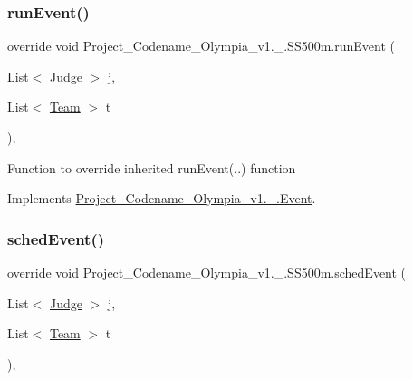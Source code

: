 \mbox{\label{classProject__Codename__Olympia__v1_1_1__0_1_1SS500m_a28582161ab61bb80635656e48ebfc664}} 
\subsubsection{\texorpdfstring{run\+Event()}{runEvent()}}
{\footnotesize\ttfamily override void Project\+\_\+\+Codename\+\_\+\+Olympia\+\_\+v1.\+\_.\+S\+S500m.\+run\+Event (\begin{DoxyParamCaption}\item[{List$<$ \hyperlink{classProject__Codename__Olympia__v1_1_1__0_1_1Judge}{Judge} $>$}]{j,  }\item[{List$<$ \hyperlink{classProject__Codename__Olympia__v1_1_1__0_1_1Team}{Team} $>$}]{t }\end{DoxyParamCaption})\hspace{0.3cm}{\ttfamily [inline]}, {\ttfamily [virtual]}}

Function to override inherited run\+Event(..) function 

Implements \hyperlink{classProject__Codename__Olympia__v1_1_1__0_1_1Event_ac6ff060da23153c02da49937dcf9f326}{Project\+\_\+\+Codename\+\_\+\+Olympia\+\_\+v1.\+\_.\+Event}.

\mbox{\label{classProject__Codename__Olympia__v1_1_1__0_1_1SS500m_a11d698b484f98493d11661d43fa3ec12}} 
\subsubsection{\texorpdfstring{sched\+Event()}{schedEvent()}}
{\footnotesize\ttfamily override void Project\+\_\+\+Codename\+\_\+\+Olympia\+\_\+v1.\+\_.\+S\+S500m.\+sched\+Event (\begin{DoxyParamCaption}\item[{List$<$ \hyperlink{classProject__Codename__Olympia__v1_1_1__0_1_1Judge}{Judge} $>$}]{j,  }\item[{List$<$ \hyperlink{classProject__Codename__Olympia__v1_1_1__0_1_1Team}{Team} $>$}]{t }\end{DoxyParamCaption})\hspace{0.3cm}{\ttfamily [inline]}, {\ttfamily [virtual]}}

